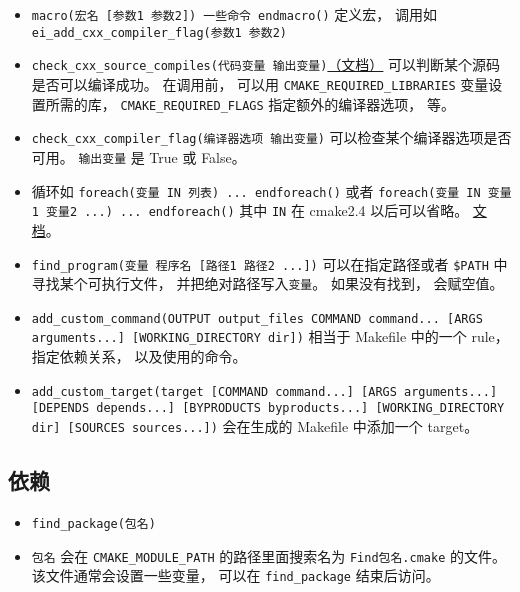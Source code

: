 \begin{itemize}
\item \verb|macro(宏名 [参数1 参数2]) 一些命令 endmacro()| 定义宏， 调用如 \verb|ei_add_cxx_compiler_flag(参数1 参数2)|
\item \verb|check_cxx_source_compiles(代码变量 输出变量)|\href{https://cmake.org/cmake/help/latest/module/CheckCXXSourceCompiles.html}{（文档）} 可以判断某个源码是否可以编译成功。 在调用前， 可以用 \verb|CMAKE_REQUIRED_LIBRARIES| 变量设置所需的库， \verb|CMAKE_REQUIRED_FLAGS| 指定额外的编译器选项， 等。
\item \verb|check_cxx_compiler_flag(编译器选项 输出变量)| 可以检查某个编译器选项是否可用。 \verb|输出变量| 是 True 或 False。
\item 循环如 \verb|foreach(变量 IN 列表) ... endforeach()| 或者 \verb|foreach(变量 IN 变量1 变量2 ...) ... endforeach()| 其中 \verb|IN| 在 cmake2.4 以后可以省略。 \href{https://cmake.org/cmake/help/latest/command/foreach.html}{文档}。
\item \verb|find_program(变量 程序名 [路径1 路径2 ...])| 可以在指定路径或者 \verb|$PATH| 中寻找某个可执行文件， 并把绝对路径写入\verb|变量|。 如果没有找到， 会赋空值。
\item \verb|add_custom_command(OUTPUT output_files COMMAND command... [ARGS arguments...] [WORKING_DIRECTORY dir])| 相当于 Makefile 中的一个 rule， 指定依赖关系， 以及使用的命令。
\item \verb|add_custom_target(target [COMMAND command...] [ARGS arguments...] [DEPENDS depends...] [BYPRODUCTS byproducts...] [WORKING_DIRECTORY dir] [SOURCES sources...])| 会在生成的 Makefile 中添加一个 target。
\end{itemize}

\subsection{依赖}
\begin{itemize}
\item \verb|find_package(包名)|
\item \verb|包名| 会在 \verb|CMAKE_MODULE_PATH| 的路径里面搜索名为 \verb|Find包名.cmake| 的文件。 该文件通常会设置一些变量， 可以在 \verb|find_package| 结束后访问。
\end{itemize}


